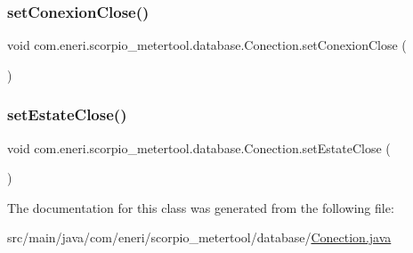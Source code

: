 \subsubsection{\texorpdfstring{set\+Conexion\+Close()}{setConexionClose()}}
{\footnotesize\ttfamily void com.\+eneri.\+scorpio\+\_\+metertool.\+database.\+Conection.\+set\+Conexion\+Close (\begin{DoxyParamCaption}{ }\end{DoxyParamCaption})}

\mbox{\label{classcom_1_1eneri_1_1scorpio__metertool_1_1database_1_1_conection_ac1f8c5f49eaa834f82f9d3ebdb1c6f64}} 
\subsubsection{\texorpdfstring{set\+Estate\+Close()}{setEstateClose()}}
{\footnotesize\ttfamily void com.\+eneri.\+scorpio\+\_\+metertool.\+database.\+Conection.\+set\+Estate\+Close (\begin{DoxyParamCaption}{ }\end{DoxyParamCaption})}



The documentation for this class was generated from the following file\+:\begin{DoxyCompactItemize}
\item 
src/main/java/com/eneri/scorpio\+\_\+metertool/database/\hyperlink{_conection_8java}{Conection.\+java}\end{DoxyCompactItemize}
